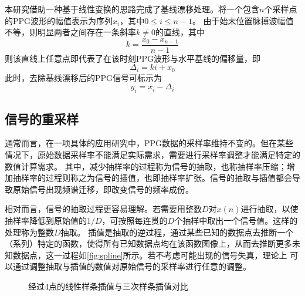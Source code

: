 本研究借助一种基于线性变换的思路完成了基线漂移处理。将一个包含$n$个采样点的PPG波形的幅值表示为序列$x_i$，其中$0 \le i \le n-1$。
由于始末位置脉搏波幅值不等，则明显两者之间存在一条斜率$k \ne 0$的直线，其中
\begin{equation}
    \label{equ:linek}
    k=\frac{x_0-x_{n-1}}{n-1}
\end{equation}
则该直线上任意点即代表了在该时刻PPG波形与水平基线的偏移量，即
\begin{equation}
    \label{equ:liney}
    \Delta_i=ki+x_0
\end{equation}
此时，去除基线漂移后的PPG信号可标示为
\begin{equation}
    \label{equ:adjusta}
    y_i=x_i-\Delta_i
\end{equation}

\subsection{信号的重采样}
通常而言，在一项具体的应用研究中，PPG数据的采样率维持不变的。但在某些情况下，原始数据采样率不能满足实际需求，需要进行采样率调整才能满足特定的数值计算需求。
其中，减少抽样率的过程称为信号的抽取，也称抽样率压缩；增加抽样率的过程则称之为信号的插值，也即抽样率扩张\cite{Cheng2008}。信号的抽取与插值都会导致原始信号出现频谱迁移，即改变信号的频率成份\cite{Cheng2008}。

相对而言，信号的抽取过程更容易理解。若需要用整数$D$对$x(n)$进行抽取，以使抽样率降低到原始值的$1/D$，可按照每连贯的$D$个抽样中取出一个信号值。这样的处理称为整数$D$抽取\cite{Cheng2008}。
插值是抽取的逆过程，通过某些已知的数据点去推断一个（系列）特定的函数，使得所有已知数据点均在该函数图像上，从而去推断更多未知数据点，这一过程如\autoref{fig:spline}所示。若不考虑可能出现的信号失真，理论上
可以通过调整抽取与插值的数值对原始信号的采样率进行任意的调整。
\begin{figure}[htbp]
    \centering
    \quad
    \caption{\label{fig:spline}经过4点的线性样条插值与三次样条插值对比}
\end{figure}

